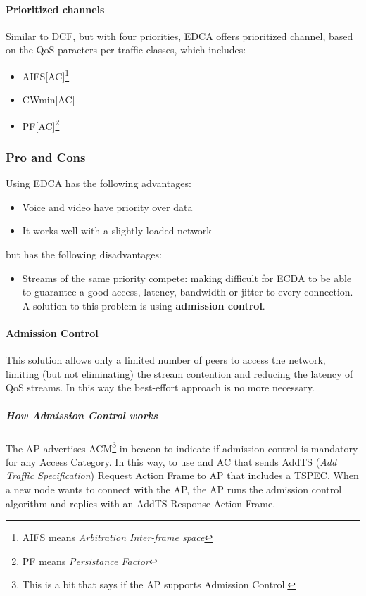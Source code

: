 \paragraph*{Prioritized channels} Similar to DCF, but with four priorities, EDCA offers prioritized channel, based on the QoS paraeters per traffic classes, which includes:
\begin{itemize}
\item AIFS[AC]\footnote{AIFS means \textit{Arbitration Inter-frame space}}
\item CWmin[AC]
\item PF[AC]\footnote{PF means \textit{Persistance Factor}}
\end{itemize}

\subsubsection{Pro and Cons}

Using EDCA has the following advantages:
\begin{itemize}
\item Voice and video have priority over data
\item It works well with a slightly loaded network
\end{itemize}
but has the following disadvantages:
\begin{itemize}
\item Streams of the same priority compete: making difficult for ECDA to be able
  to guarantee a good access, latency, bandwidth or jitter to every connection. A solution to this problem is using \textbf{admission control}.
\end{itemize}

\paragraph*{Admission Control} This solution allows only a limited number of peers to access the network, limiting (but not eliminating) the stream contention and reducing the latency of QoS streams.
In this way the best-effort approach is no more necessary.
\subparagraph*{How Admission Control works} The AP advertises ACM\footnote{This is a bit that says if the AP supports Admission Control.} in beacon to indicate if admission control is mandatory for any Access Category. In this way, to use and AC that  sends AddTS (\textit{Add Traffic Specification}) Request Action Frame to AP that includes a TSPEC.
When a new node wants to connect with the AP, the AP runs the admission control algorithm and replies with an AddTS Response Action Frame.


